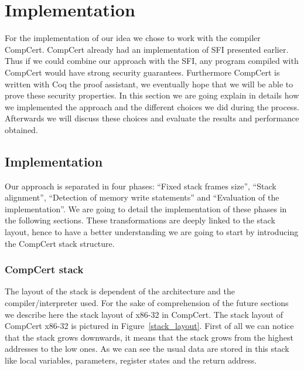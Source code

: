 \documentclass[11pt]{sdm}
\begin{document}
\newpage
\section{Implementation}
\label{sec:implementation}

For the implementation of our idea we chose to work with the compiler CompCert. CompCert already had an implementation of SFI presented earlier. Thus if we could combine our approach with the SFI, any program compiled with CompCert would have strong security guarantees. Furthermore CompCert is written with Coq the proof assistant, we eventually hope that we will be able to prove these security properties. In this section we are going explain in details how we implemented the approach and the different choices we did during the process. Afterwards we will discuss these choices and evaluate the results and performance obtained.

\subsection{Implementation}
\label{sub:Implementation}
	Our approach is separated in four phases: ``Fixed stack frames size'', ``Stack alignment'', ``Detection of memory write statements'' and ``Evaluation of the implementation''. We are going to detail the implementation of these phases in the following sections. These transformations are deeply linked to the stack layout, hence to have a better understanding we are going to start by introducing the CompCert stack structure.

\subsubsection{CompCert stack}
\label{ssub:CompCert stack}
	The layout of the stack is dependent of the architecture and the compiler/interpreter used. For the sake of comprehension of the future sections we describe here the stack layout of x86-32 in CompCert.
The stack layout of CompCert x86-32 is pictured in Figure~\ref{stack_layout}.
First of all we can notice that the stack grows downwards, it means that the stack grows from the highest addresses to the low ones.
As we can see the usual data are stored in this stack like local variables, parameters, register states and the return address.
\end{document}
